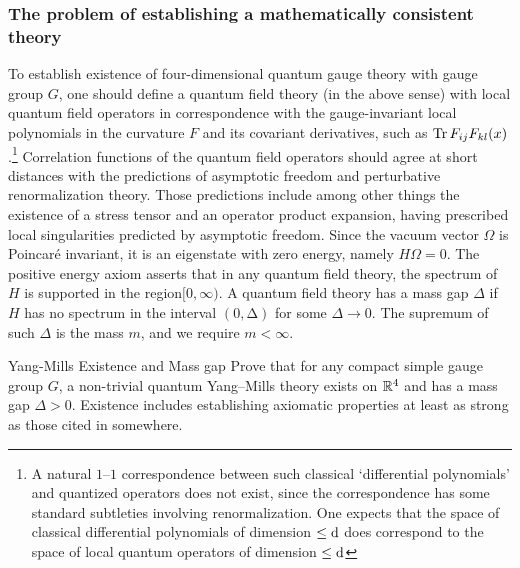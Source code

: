  \subsubsection{The problem of establishing a mathematically consistent theory}
 \label{subsubsec:massgap}
 To establish existence of four-dimensional quantum gauge theory with gauge
 group $G$, one should define a quantum field theory (in the above sense) with local
 quantum field operators in correspondence with the gauge-invariant local polynomials in the curvature $F$ and its covariant derivatives, such as $\Tr F_{ij} F_{kl} (x)$.\footnote{A natural $1–1$ correspondence between such classical ‘differential polynomials’ and quantized
 	operators does not exist, since the correspondence has some standard subtleties involving renormalization. One expects that the space of classical differential polynomials of dimension $\leq \mathrm{d}$	does correspond to the space of local quantum operators of dimension $\leq \mathrm{d}$} Correlation functions of the quantum field operators should agree at short distances
 with the predictions of asymptotic freedom and perturbative renormalization theory. Those predictions include among other things the
 existence of a stress tensor and an operator product expansion, having prescribed
 local singularities predicted by asymptotic freedom.
 Since the vacuum vector $\Omega$ is Poincaré invariant, it is an eigenstate with zero
 energy, namely $H\Omega = 0$. The positive energy axiom asserts that in any quantum
 field theory, the spectrum of $H$ is supported in the region$ [0, \infty)$. A quantum field
 theory has a mass gap $\Delta$ if $H$ has no spectrum in the interval $(0, ∆)$ for some $\Delta \rightarrow 0$.
 The supremum of such $\Delta$ is the mass $m$, and we require $m <\infty$.
 \begin{mybox}{Yang-Mills Existence and Mass gap}
 	Prove that for any compact simple gauge
 	group $G$, a non-trivial quantum Yang–Mills theory exists on $\mathbb{R}^4$ and has a mass gap
 	$\Delta > 0$. Existence includes establishing axiomatic properties at least as strong as
 	those cited in somewhere.
 \end{mybox}
